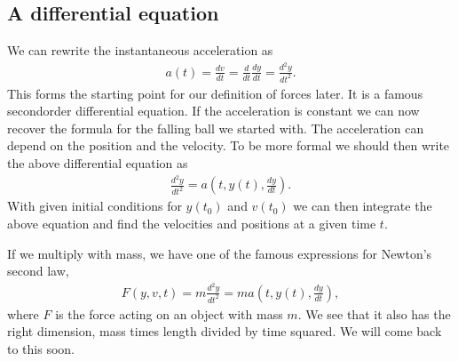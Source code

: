 \documentclass[letterpaper,10pt,english]{sphinxmanual}
\begin{document}
\subsection{A differential equation}
\label{\detokenize{chapter2:a-differential-equation}}
We can rewrite the instantaneous acceleration as
\begin{equation*}
\begin{split}
a(t) = \frac{dv}{dt}=\frac{d}{dt}\frac{dy}{dt}=\frac{d^2y}{dt^2}.
\end{split}
\end{equation*}
This forms the starting point for our definition of forces later. It is a famous second\sphinxhyphen{}order differential equation. If the acceleration is constant we can now recover the formula for the falling ball we started with.
The acceleration can depend on the position and the velocity. To be more formal we should then write the above differential equation as
\begin{equation*}
\begin{split}
\frac{d^2y}{dt^2}=a(t,y(t),\frac{dy}{dt}).
\end{split}
\end{equation*}
With given initial conditions for \(y(t_0)\) and \(v(t_0)\) we can then
integrate the above equation and find the velocities and positions at
a given time \(t\).

If we multiply with mass, we have one of the famous expressions for Newton’s second law,
\begin{equation*}
\begin{split}
F(y,v,t)=m\frac{d^2y}{dt^2}=ma(t,y(t),\frac{dy}{dt}),
\end{split}
\end{equation*}
where \(F\) is the force acting on an object with mass \(m\). We see that it also has the right dimension, mass times length divided by time squared.
We will come back to this soon.
\end{document}
